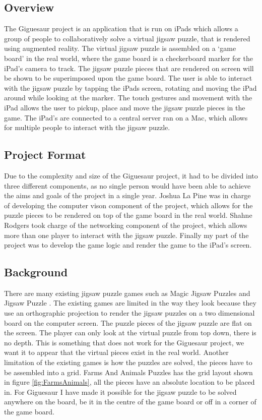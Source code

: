 \documentclass{article}
\begin{document}
\subsection{Overview}
The Giguesaur project is an application that is run on iPads which allows a
group of people to collaboratively solve a virtual jigsaw puzzle, that is
rendered using augmented reality. The virtual jigsaw puzzle is assembled on a
`game board' in the real world, where the game board is a checkerboard marker
for the iPad's camera to track. The jigsaw puzzle pieces that are rendered on
screen will be shown to be superimposed upon the game board. The user is able to
interact with the jigsaw puzzle by tapping the iPads screen, rotating and moving
the iPad around while looking at the marker. The touch gestures and movement
with the iPad allows the user to pickup, place and move the jigsaw puzzle pieces
in the game. The iPad's are connected to a central server ran on a Mac, which
allows for multiple people to interact with the jigsaw puzzle.

\subsection{Project Format}
Due to the complexity and size of the Giguesaur project, it had to be divided
into three different components, as no single person would have been able to
achieve the aims and goals of the project in a single year. Joshua La Pine was
in charge of developing the computer vison component of the project, which
allows for the puzzle pieces to be rendered on top of the game board in the real
world. Shahne Rodgers took charge of the networking component of the project,
which allows more than one player to interact with the jigsaw puzzle. Finally my
part of the project was to develop the game logic and render the game to the
iPad's screen.

\subsection{Background}
There are many existing jigsaw puzzle games such as Magic Jigsaw Puzzles
\cite{ref:MagicJigsaw} and Jigsaw Puzzle \cite{ref:JigsawPuzzle}. The existing
games are limited in the way they look because they use an orthographic
projection to render the jigsaw puzzles on a two dimensional board on the
computer screen. The puzzle pieces of the jigsaw puzzle are flat on the
screen. The player can only look at the virtual puzzle from top down, there is
no depth. This is something that does not work for the Giguesaur project, we
want it to appear that the virtual pieces exist in the real world. Another
limitation of the existing games is how the puzzles are solved, the pieces have
to be assembled into a grid. Farms And Animals Puzzles \cite{ref:FarmPuzzle} has
the grid layout shown in figure \ref{fig:FarmsAnimals}, all the pieces have an
absolute location to be placed in. For Giguesaur I have made it possible for the
jigsaw puzzle to be solved anywhere on the board, be it in the centre of the
game board or off in a corner of the game board.
\end{document}
